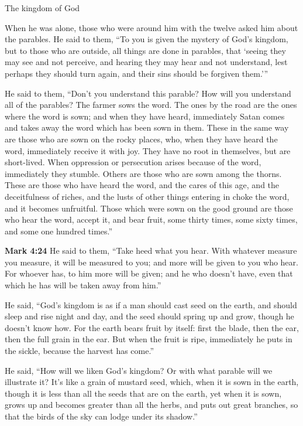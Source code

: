 \documentclass[10pt,twoside]{article} %
\newcommand{\quotesize}{\normalsize{}}
\newenvironment{quotetext}{\begingroup\quotesize}{\endgroup}
\newcommand{\intex}[1]{\index[texts]{#1}}
\newcommand{\bible}[2]{\begin{quotetext}\textbf{#1}\intex{#1} #2\end{quotetext}}
\newcommand{\gospelmark}[2]{\bible{Mark #1}{#2}}
\begin{document}
\begin{section}{The kingdom of God}
{  When he was alone, those who were around him with the twelve asked him about the parables.   He said to them, ``To you is given the mystery of God's kingdom, but to those who are outside, all things are done in parables,    that `seeing they may see and not perceive, and hearing they may hear and not understand, lest perhaps they should turn again, and their sins should be forgiven them.'{}''

  He said to them, ``Don't you understand this parable? How will you understand all of the parables?    The farmer sows the word.    The ones by the road are the ones where the word is sown; and when they have heard, immediately Satan comes and takes away the word which has been sown in them.    These in the same way are those who are sown on the rocky places, who, when they have heard the word, immediately receive it with joy.    They have no root in themselves, but are short-lived. When oppression or persecution arises because of the word, immediately they stumble.    Others are those who are sown among the thorns. These are those who have heard the word,    and the cares of this age, and the deceitfulness of riches, and the lusts of other things entering in choke the word, and it becomes unfruitful.    Those which were sown on the good ground are those who hear the word, accept it, and bear fruit, some thirty times, some sixty times, and some one hundred times.''}


\gospelmark{4:24}{
  He said to them, ``Take heed what you hear. With whatever measure you measure, it will be measured to you; and more will be given to you who hear.    For whoever has, to him more will be given; and he who doesn't have, even that which he has will be taken away from him.''

  He said, ``God's kingdom is as if a man should cast seed on the earth,    and should sleep and rise night and day, and the seed should spring up and grow, though he doesn't know how.    For the earth bears fruit by itself: first the blade, then the ear, then the full grain in the ear.    But when the fruit is ripe, immediately he puts in the sickle, because the harvest has come.''

  He said, ``How will we liken God's kingdom? Or with what parable will we illustrate it?    It's like a grain of mustard seed, which, when it is sown in the earth, though it is less than all the seeds that are on the earth,    yet when it is sown, grows up and becomes greater than all the herbs, and puts out great branches, so that the birds of the sky can lodge under its shadow.''

}
\end{section}
\end{document}
